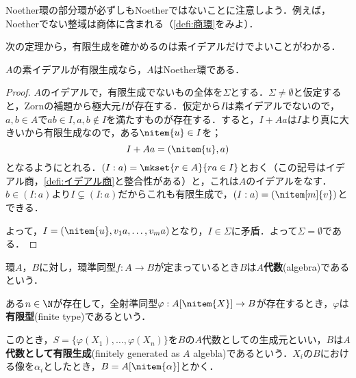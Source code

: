 Noether環の部分環が必ずしもNoetherではないことに注意しよう．例えば，Noetherでない整域は商体に含まれる（\ref{defi:商環}をみよ）．

次の定理から，有限生成を確かめるのは素イデアルだけでよいことがわかる．
\begin{thm}[I.S.Cohen]
	$A$の素イデアルが有限生成なら，$A$はNoether環である．
\end{thm}
\begin{proof}
	$A$のイデアルで，有限生成でないもの全体を$\Sigma$とする．$\Sigma\neq\emptyset$と仮定すると，Zornの補題から極大元$I$が存在する．仮定から$I$は素イデアルでないので，$a,b\in A$で$ab\in I,a,b\not\in I$を満たすものが存在する．すると，$I+Aa$は$I$より真に大きいから有限生成なので，ある$\nitem{u}\in I$を；
	\[I+Aa=(\nitem{u},a)\]
	となるようにとれる．$(I:a)=\mkset{r\in A}{ra\in I}$とおく（この記号はイデアル商，\ref{defi:イデアル商}と整合性がある）と，これは$A$のイデアルをなす．$b\in (I:a)$より$I\subsetneq(I:a)$だからこれも有限生成で，$(I:a)=(\nitem[m]{v})$とできる．
	
	よって，$I=(\nitem{u},v_1a,\dots,v_ma)$となり，$I\in\Sigma$に矛盾．よって$\Sigma=\emptyset$である．
\end{proof}

\begin{defi}[$A$代数]
	環$A，B$に対し，環準同型$f:A\to B$が定まっているとき$B$は$A$\textbf{代数}(algebra)であるという．
\end{defi}

\begin{defi}[有限型]
	ある$n\in\N$が存在して，全射準同型$\varphi:A[\nitem{X}]\to B$が存在するとき，$\varphi$は\textbf{有限型}(finite type)であるという．
\end{defi}

このとき，$S=\{\varphi(X_1),\dots,\varphi(X_n)\}$を$B$の$A$代数としての生成元といい，$B$は$A$\textbf{代数として有限生成}(finitely generated as $A$ algebla)であるという．$X_i$の$B$における像を$\alpha_i$としたとき，$B=A[\nitem{\alpha}]$とかく．

